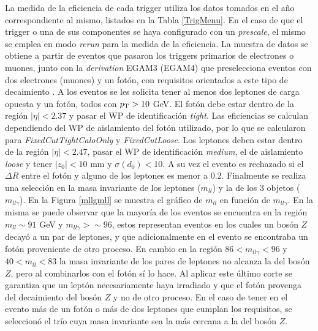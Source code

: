 La medida de la eficiencia de cada trigger utiliza los datos tomados en el año correspondiente al mismo, listados en la Tabla \ref{TrigMenu}. En el caso de que el trigger o una de sus componentes se haya configurado con un \textit{prescale}, el mismo se emplea en modo \textit{rerun} para la medida de la eficiencia. La muestra de datos se obtiene a partir de eventos que pasaron los triggers primarios de electrones o muones, junto con la \textit{derivation} EGAM3 (EGAM4) que preselecciona eventos con dos electrones (muones) y un fotón, con requisitos orientados a este tipo de decaimiento 
 . 
A los eventos se les solicita tener al menos dos leptones de carga opuesta y un fotón, todos con $p_{\text{T}}>10$ GeV. El fotón debe estar dentro de la región $|\eta| < 2.37$ y pasar el WP de identificación \textit{tight}. Las eficiencias se calculan dependiendo del WP de aislamiento del fotón utilizado, por lo que se calcularon para \textit{FixedCutTightCaloOnly} y \textit{FixedCutLoose}. Los leptones deben estar dentro de la región $|\eta| < 2.47$, pasar el WP de identificación \textit{medium}, el de aislamiento \textit{loose} y tener $|z_0| < 10$ mm y $\sigma(d_0) < 10$. A su vez el evento es rechazado si el $\Delta R$ entre el fotón y alguno de los leptones es menor a 0.2. Finalmente se realiza una selección en la masa invariante de los leptones ($m_{ll}$) y la de los 3 objetos ($m_{ll\gamma}$). En la Figura \ref{mllgmll} se muestra el gráfico de $m_{ll}$ en función de $m_{ll\gamma}$. En la misma se puede observar que la mayoría de los eventos se encuentra en la región $m_{ll}\sim91$ GeV y $m_{ll\gamma}>\sim96$, estos representan eventos en los cuales un bosón $Z$ decayó a un par de leptones, y que adicionalmente en el evento se encontraba un fotón proveniente de otro proceso. En cambio en la región $86<m_{ll\gamma}<96$ y $40<m_{ll}<83$ la masa invariante de los pares de leptones no alcanza la del bosón $Z$, pero al combinarlos con el fotón sí lo hace. Al aplicar este último corte se garantiza que un leptón necesariamente haya irradiado y que el fotón provenga del decaimiento del bosón $Z$ y no de otro proceso. En el caso de tener en el evento más de un fotón o más de dos leptones que cumplan los requisitos, se seleccionó el trío cuya masa invariante sea la más cercana a la del bosón $Z$.

